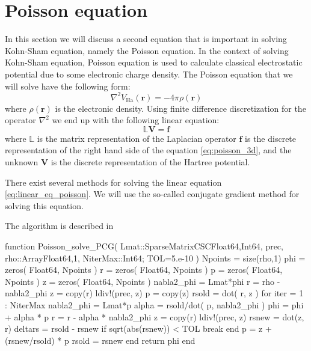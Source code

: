 \section{Poisson equation}

In this section we will discuss a second equation that is important
in solving Kohn-Sham equation, namely the Poisson equation. In the
context of solving Kohn-Sham equation, Poisson equation is used to
calculate classical electrostatic potential due to some electronic
charge density.
The Poisson equation that we will solve have the following form:
\begin{equation}
\nabla^2 V_{\mathrm{Ha}}(\mathbf{r}) = -4\pi\rho(\mathbf{r})
\label{eq:poisson_3d}
\end{equation}
where $\rho(\mathbf{r})$ is the electronic density. Using finite
difference discretization for the operator $\nabla^2$ we end up with
the following linear equation:
\begin{equation}
\mathbb{L} \mathbf{V} = \mathbf{f}
\label{eq:linear_eq_poisson}
\end{equation}
where $\mathbb{L}$ is the matrix representation of the Laplacian operator
$\mathbf{f}$ is the discrete representation of the right hand side of the equation
\ref{eq:poisson_3d}, and the unknown $\mathbf{V}$ is the discrete representation of
the Hartree potential.


There exist several methods for solving the linear equation \ref{eq:linear_eq_poisson}.
We will use the so-called conjugate gradient method for solving this equation.

The algorithm is described in 

\begin{juliacode}
function Poisson_solve_PCG( Lmat::SparseMatrixCSC{Float64,Int64},
                            prec,
                            rho::Array{Float64,1}, NiterMax::Int64;
                            TOL=5.e-10 )
    Npoints = size(rho,1)
    phi = zeros( Float64, Npoints )
    r = zeros( Float64, Npoints )
    p = zeros( Float64, Npoints )
    z = zeros( Float64, Npoints )
    nabla2_phi = Lmat*phi
    r = rho - nabla2_phi
    z = copy(r)
    ldiv!(prec, z)
    p = copy(z)
    rsold = dot( r, z )
    for iter = 1 : NiterMax
        nabla2_phi = Lmat*p
        alpha = rsold/dot( p, nabla2_phi )
        phi = phi + alpha * p
        r = r - alpha * nabla2_phi
        z = copy(r)
        ldiv!(prec, z)
        rsnew = dot(z, r)
        deltars = rsold - rsnew
        if sqrt(abs(rsnew)) < TOL
            break
        end
        p = z + (rsnew/rsold) * p
        rsold = rsnew
    end
    return phi
end
\end{juliacode}

